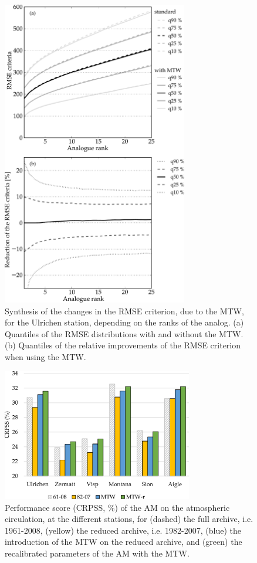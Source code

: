 \documentclass[hess, manuscript]{copernicus}
\begin{document}
\begin{figure}[htb]
	\begin{center}
		\includegraphics[width=8.1cm]{figures/changes_RMSE_value_and_gain.pdf}
	\end{center}
	\caption{Synthesis of the changes in the RMSE criterion, due to the MTW, for the Ulrichen station, depending on the ranks of the analog. (a) Quantiles of the RMSE distributions with and without the MTW. (b) Quantiles of the relative improvements of the RMSE criterion when using the MTW.}
	\label{fig:changes_RMSE}
\end{figure}

\begin{figure}[htb]
	\includegraphics[width=8.3cm]{figures/plots_CRPSS_2Z.pdf}
	\caption{Performance score (CRPSS, \%) of the AM on the atmospheric circulation, at the different stations, for (dashed) the full archive, i.e. 1961-2008, (yellow) the reduced archive, i.e. 1982-2007, (blue) the introduction of the MTW on the reduced archive, and (green) the recalibrated parameters of the AM with the MTW.}
	\label{fig:plots_CRPSS_2Z}
\end{figure}
\end{document}
